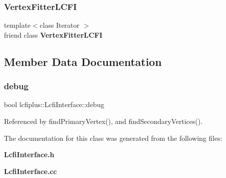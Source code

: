 \subsubsection{Vertex\+Fitter\+L\+C\+FI}
{\footnotesize\ttfamily template$<$class Iterator $>$ \\
friend class \textbf{ Vertex\+Fitter\+L\+C\+FI}\hspace{0.3cm}{\ttfamily [friend]}}



\subsection{Member Data Documentation}
\mbox{\label{classlcfiplus_1_1LcfiInterface_a8fea94d95b2e7aadcc1d2a203cb2a2b0}} 
\subsubsection{debug}
{\footnotesize\ttfamily bool lcfiplus\+::\+Lcfi\+Interface\+::debug}



Referenced by find\+Primary\+Vertex(), and find\+Secondary\+Vertices().



The documentation for this class was generated from the following files\+:\begin{DoxyCompactItemize}
\item 
\textbf{ Lcfi\+Interface.\+h}\item 
\textbf{ Lcfi\+Interface.\+cc}\end{DoxyCompactItemize}
